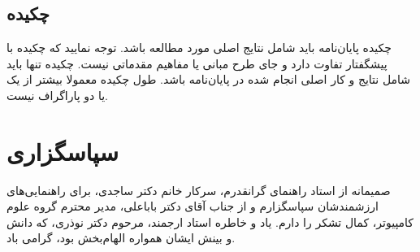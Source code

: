 \documentclass[12pt]{report}
\begin{document}
\chapter*{}
\section*{چکیده}
چکیده پایان‌نامه باید شامل نتایج اصلی مورد مطالعه باشد. توجه نمایید که چکیده با پیشگفتار تفاوت دارد و جای طرح مبانی یا مفاهیم مقدماتی نیست. چکیده تنها باید شامل نتایج و کار اصلی انجام شده در پایان‌نامه باشد. طول چکیده معمولا بیشتر از یک یا دو پاراگراف نیست.


\chapter*{سپاسگزاری}
صمیمانه از استاد راهنمای گرانقدرم، سرکار خانم دکتر ساجدی، برای راهنمایی‌های ارزشمندشان سپاسگزارم و از جناب آقای دکتر باباعلی، مدیر محترم گروه علوم کامپیوتر، کمال تشکر را دارم. یاد و خاطره استاد ارجمند، مرحوم دکتر نوذری، که دانش و بینش ایشان همواره الهام‌بخش بود، گرامی باد.
%
\end{document}
